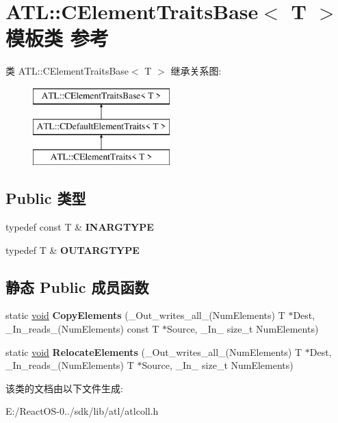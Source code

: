 \hypertarget{class_a_t_l_1_1_c_element_traits_base}{}\section{A\+TL\+:\+:C\+Element\+Traits\+Base$<$ T $>$ 模板类 参考}
\label{class_a_t_l_1_1_c_element_traits_base}
类 A\+TL\+:\+:C\+Element\+Traits\+Base$<$ T $>$ 继承关系图\+:\begin{figure}[H]
\begin{center}
\leavevmode
\includegraphics[height=3.000000cm]{class_a_t_l_1_1_c_element_traits_base}
\end{center}
\end{figure}
\subsection*{Public 类型}
\begin{DoxyCompactItemize}
\item 
\mbox{\label{class_a_t_l_1_1_c_element_traits_base_ad20370f8444d2c17cb14c23113195eb9}} 
typedef const T \& {\bfseries I\+N\+A\+R\+G\+T\+Y\+PE}
\item 
\mbox{\label{class_a_t_l_1_1_c_element_traits_base_a42eee658c6c4da479f10c73b6f52ce82}} 
typedef T \& {\bfseries O\+U\+T\+A\+R\+G\+T\+Y\+PE}
\end{DoxyCompactItemize}
\subsection*{静态 Public 成员函数}
\begin{DoxyCompactItemize}
\item 
\mbox{\label{class_a_t_l_1_1_c_element_traits_base_a9761a8479e7328d30253dba546740658}} 
static \hyperlink{interfacevoid}{void} {\bfseries Copy\+Elements} (\+\_\+\+Out\+\_\+writes\+\_\+all\+\_\+(Num\+Elements) T $\ast$Dest, \+\_\+\+In\+\_\+reads\+\_\+(Num\+Elements) const T $\ast$Source, \+\_\+\+In\+\_\+ size\+\_\+t Num\+Elements)
\item 
\mbox{\label{class_a_t_l_1_1_c_element_traits_base_a14e3a2482994d23d9f899ba5b03648fe}} 
static \hyperlink{interfacevoid}{void} {\bfseries Relocate\+Elements} (\+\_\+\+Out\+\_\+writes\+\_\+all\+\_\+(Num\+Elements) T $\ast$Dest, \+\_\+\+In\+\_\+reads\+\_\+(Num\+Elements) T $\ast$Source, \+\_\+\+In\+\_\+ size\+\_\+t Num\+Elements)
\end{DoxyCompactItemize}


该类的文档由以下文件生成\+:\begin{DoxyCompactItemize}
\item 
E\+:/\+React\+O\+S-\/0../sdk/lib/atl/atlcoll.\+h\end{DoxyCompactItemize}

